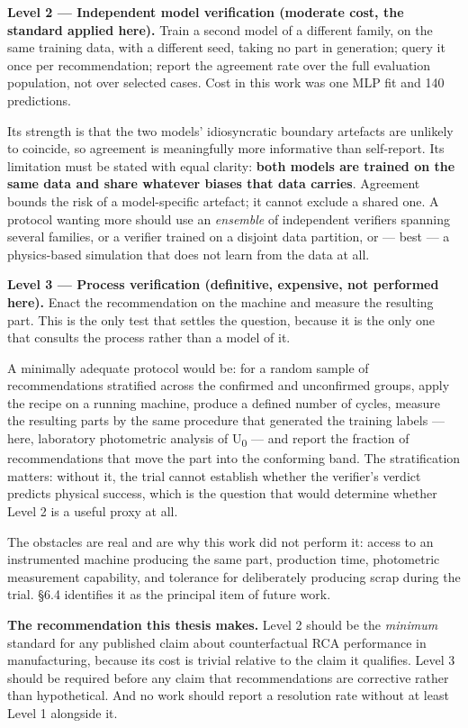\textbf{Level 2 --- Independent model verification (moderate cost, the standard applied here).} Train a second model of a different family, on the same training data, with a different seed, taking no part in generation; query it once per recommendation; report the agreement rate over the full evaluation population, not over selected cases. Cost in this work was one MLP fit and 140 predictions.

Its strength is that the two models' idiosyncratic boundary artefacts are unlikely to coincide, so agreement is meaningfully more informative than self-report. Its limitation must be stated with equal clarity: \textbf{both models are trained on the same data and share whatever biases that data carries}. Agreement bounds the risk of a model-specific artefact; it cannot exclude a shared one. A protocol wanting more should use an \emph{ensemble} of independent verifiers spanning several families, or a verifier trained on a disjoint data partition, or --- best --- a physics-based simulation that does not learn from the data at all.

\textbf{Level 3 --- Process verification (definitive, expensive, not performed here).} Enact the recommendation on the machine and measure the resulting part. This is the only test that settles the question, because it is the only one that consults the process rather than a model of it.

A minimally adequate protocol would be: for a random sample of recommendations stratified across the confirmed and unconfirmed groups, apply the recipe on a running machine, produce a defined number of cycles, measure the resulting parts by the same procedure that generated the training labels --- here, laboratory photometric analysis of U\textsubscript{0} --- and report the fraction of recommendations that move the part into the conforming band. The stratification matters: without it, the trial cannot establish whether the verifier's verdict predicts physical success, which is the question that would determine whether Level 2 is a useful proxy at all.

The obstacles are real and are why this work did not perform it: access to an instrumented machine producing the same part, production time, photometric measurement capability, and tolerance for deliberately producing scrap during the trial. §6.4 identifies it as the principal item of future work.

\textbf{The recommendation this thesis makes.} Level 2 should be the \emph{minimum} standard for any published claim about counterfactual RCA performance in manufacturing, because its cost is trivial relative to the claim it qualifies. Level 3 should be required before any claim that recommendations are corrective rather than hypothetical. And no work should report a resolution rate without at least Level 1 alongside it.

